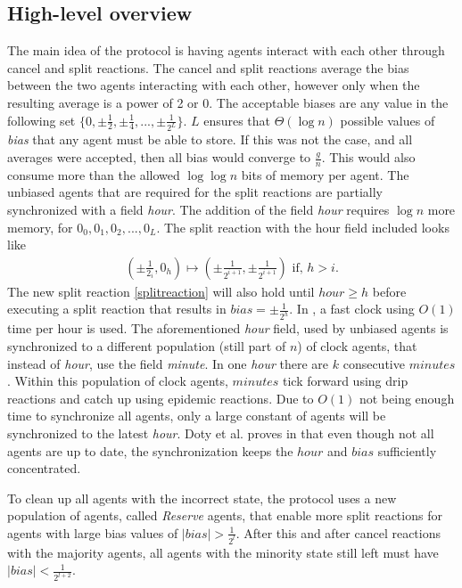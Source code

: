 \subsection{High-level overview}

The main idea of the protocol is having agents interact with each other through cancel and split reactions. The cancel and split reactions average the bias between the two agents interacting with each other, however only when the resulting average is a power of 2 or 0. The acceptable biases are any value in the following set $\{ 0, \pm \frac{1}{2}, \pm \frac{1}{4}, ...,  \pm \frac{1}{2^L} \}$. $L$ ensures that $\Theta(\log n)$ possible values of \emph{bias} that any agent must be able to store. If this was not the case, and all averages were accepted, then all bias would converge to $\frac{g}{n}$. This would also consume more than the allowed $\log \log n$ bits of memory per agent. The unbiased agents that are required for the split reactions are partially synchronized with a field \emph{hour}. The addition of the field \emph{hour} requires $\log n$ more memory, for $0_0, 0_1, 0_2, ..., 0_L$. The split reaction with the hour field included looks like
\begin{align}
    (\pm \frac{1}{2_i}, 0_h) \mapsto (\pm \frac{1}{2^{i + 1}}, \pm \frac{1}{2^{i + 1}}) \text{      if, } h > i.  \label{splitreaction}
\end{align}
The new split reaction \ref{splitreaction} will also hold until $hour \geq h$ before executing a split reaction that results in $bias = \pm \frac{1}{2^h}$. In \cite{dotyTimeSpaceOptimal2022}, a fast clock using $O(1)$ time per hour is used. The aforementioned \emph{hour} field, used by unbiased agents is synchronized to a different population (still part of $n$) of clock agents, that instead of \emph{hour}, use the field \emph{minute}. In one \emph{hour} there are $k$ consecutive $minutes$. Within this population of clock agents, $minutes$ tick forward using drip reactions and catch up using epidemic reactions. Due to $O(1)$ not being enough time to synchronize all agents, only a large constant of agents will be synchronized to the latest \emph{hour}. Doty et al. proves in \cite{dotyTimeSpaceOptimal2022} that even though not all agents are up to date, the synchronization keeps the $hour$ and $bias$ sufficiently concentrated.

To clean up all agents with the incorrect state, the protocol uses a new population of agents, called \emph{Reserve} agents, that enable more split reactions for agents with large bias values of $|bias| > \frac{1}{2^l}$. After this and after cancel reactions with the majority agents, all agents with the minority state still left must have $|bias| < \frac{1}{2^{l + 2}}$. 

